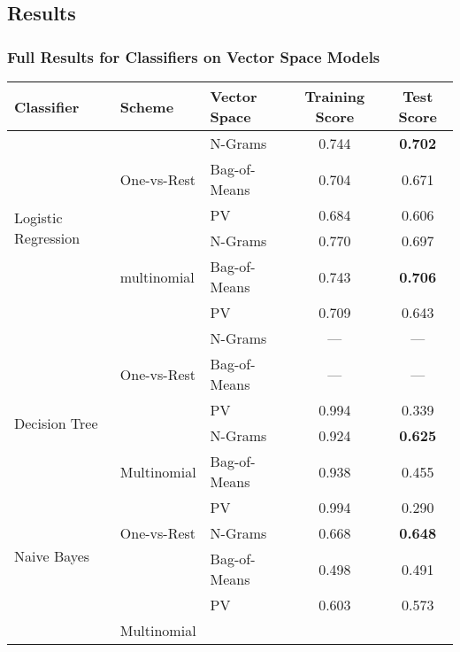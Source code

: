 \clearpage

\subsection{Results}
\label{sub:Results}

\subsubsection{Full Results for Classifiers on Vector Space Models}
\label{subs:Full Results for Classifiers on Vector Space Models}


\begin{table}[h]
  \begin{center}
    \begin{tabular}{ lll cc }
      \toprule
      Classifier & Scheme & Vector Space & Training Score & Test Score \\
      \midrule
      \multirow{6}{*}{Logistic Regression}
       & \multirow{3}{*}{One-vs-Rest}
         & N-Grams & 0.744 & \textbf{0.702} \\
       & & Bag-of-Means & 0.704 & 0.671 \\
       & & PV & 0.684 & 0.606 \\
       \cmidrule(r){2-5}
       & \multirow{3}{*}{multinomial}
       & N-Grams & 0.770 & 0.697 \\
       & & Bag-of-Means & 0.743 & \textbf{0.706} \\
       & & PV & 0.709 & 0.643 \\
      \midrule
      \multirow{6}{*}{Decision Tree}
       & \multirow{3}{*}{One-vs-Rest}
         & N-Grams & --- & --- \\
       & & Bag-of-Means & --- & --- \\
       & & PV & 0.994 & 0.339 \\
       \cmidrule(r){2-5}
       & \multirow{3}{*}{Multinomial}
       & N-Grams & 0.924 & \textbf{0.625} \\
       & & Bag-of-Means & 0.938 & 0.455 \\
       & & PV & 0.994 & 0.290 \\
      \midrule
      \multirow{2}{*}{Naive Bayes}
       & \multirow{1}{*}{One-vs-Rest}
         & N-Grams & 0.668 & \textbf{0.648} \\
         & & Bag-of-Means & 0.498 & 0.491 \\
         & & PV & 0.603 & 0.573 \\
       \cmidrule(r){2-5}
       & \multirow{1}{*}{Multinomial}

\end{tabular}
\end{center}
\end{table}
